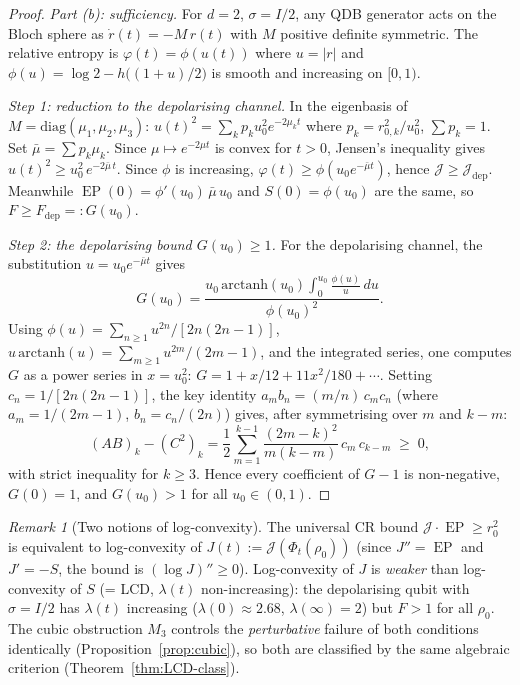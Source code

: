 \documentclass[11pt,a4paper]{article}
\theoremstyle{definition}
\theoremstyle{remark}
\newtheorem{remark}[theorem]{Remark}
\DeclareMathOperator{\EP}{EP}
\begin{document}
\begin{proof}
\emph{Part (b): sufficiency.}
For $d = 2$, $\sigma = I/2$, any QDB generator acts on the
Bloch sphere as $\dot{r}(t) = -M\,r(t)$ with $M$ positive
definite symmetric.  The relative entropy is
$\varphi(t) = \phi(u(t))$ where $u = |r|$ and
$\phi(u) = \log 2 - h\bigl((1\!+\!u)/2\bigr)$
is smooth and increasing on $[0,1)$.

\emph{Step 1: reduction to the depolarising channel.}
In the eigenbasis of $M = \mathrm{diag}(\mu_1,\mu_2,\mu_3)$:
$u(t)^2 = \sum_k p_k u_0^2 e^{-2\mu_k t}$
where $p_k = r_{0,k}^2/u_0^2$, $\sum p_k = 1$.
Set $\bar\mu = \sum p_k \mu_k$.
Since $\mu \mapsto e^{-2\mu t}$ is convex for $t > 0$,
Jensen's inequality gives
$u(t)^2 \ge u_0^2\,e^{-2\bar\mu\,t}$.
Since $\phi$ is increasing,
$\varphi(t) \ge \phi(u_0 e^{-\bar\mu t})$, hence
$\mathcal{J} \ge \mathcal{J}_{\mathrm{dep}}$.
Meanwhile $\EP(0) = \phi'(u_0)\,\bar\mu\,u_0$ and
$S(0) = \phi(u_0)$ are the same, so
$F \ge F_{\mathrm{dep}} =: G(u_0)$.

\emph{Step 2: the depolarising bound $G(u_0) \ge 1$.}
For the depolarising channel, the substitution
$u = u_0 e^{-\bar\mu t}$ gives
\[
  G(u_0)
  = \frac{u_0\,\mathrm{arctanh}(u_0)
  \displaystyle\int_0^{u_0}\frac{\phi(u)}{u}\,du}
  {\phi(u_0)^2}.
\]
Using $\phi(u) = \sum_{n \ge 1}u^{2n}/[2n(2n\!-\!1)]$,
$u\,\mathrm{arctanh}(u) = \sum_{m \ge 1}u^{2m}/(2m\!-\!1)$,
and the integrated series, one computes $G$ as a power series
in $x = u_0^2$:
$G = 1 + x/12 + 11x^2/180 + \cdots$.
Setting $c_n = 1/[2n(2n\!-\!1)]$, the key identity
$a_m b_n = (m/n)\,c_m c_n$ (where $a_m = 1/(2m\!-\!1)$,
$b_n = c_n/(2n)$) gives, after symmetrising over $m$ and $k-m$:
\begin{equation}\label{eq:G-positivity}
  (AB)_k - (C^2)_k
  = \frac{1}{2}\sum_{m=1}^{k-1}
  \frac{(2m-k)^2}{m(k-m)}\,c_m\,c_{k-m}
  \;\ge\; 0,
\end{equation}
with strict inequality for $k \ge 3$.
Hence every coefficient of $G - 1$ is non-negative, $G(0) = 1$,
and $G(u_0) > 1$ for all $u_0 \in (0,1)$.
\end{proof}

\begin{remark}[Two notions of log-convexity]\label{rem:resolution}
The universal CR bound $\mathcal{J}\cdot\EP \ge r_0^2$ is
equivalent to log-convexity of $J(t) := \mathcal{J}(\Phi_t(\rho_0))$
(since $J'' = \EP$ and $J' = -S$, the bound is $(\log J)'' \ge 0$).
Log-convexity of $J$ is \emph{weaker} than log-convexity of $S$
(= LCD, $\lambda(t)$ non-increasing):
the depolarising qubit with $\sigma = I/2$ has $\lambda(t)$
increasing ($\lambda(0) \approx 2.68$, $\lambda(\infty) = 2$)
but $F > 1$ for all $\rho_0$.
The cubic obstruction $M_3$ controls the \emph{perturbative}
failure of both conditions identically (Proposition~\ref{prop:cubic}),
so both are classified by the same algebraic criterion
(Theorem~\ref{thm:LCD-class}).
\end{remark}
\end{document}
